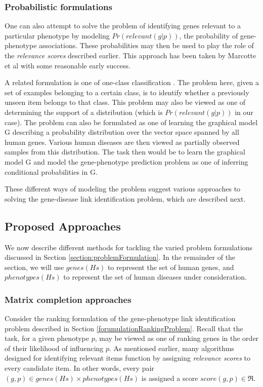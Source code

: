 \subsubsection{Probabilistic formulations}
\label{section:outlier}
One can also attempt to solve the problem of identifying genes relevant to a particular phenotype by modeling $Pr(relevant(g|p))$, the probability of gene-phenotype associations. These probabilities may then be used to play the role of the \textit{relevance scores} described earlier. This approach has been taken by Marcotte et al \cite{McGaryOrthologousPhenotypes} with some reasonable early success.

A related formulation is one of one-class classification \cite{Scholkopf99, ProteinOneClass, OutlierDetection, VillalbaOneClass}. The problem here, given a set of examples belonging to a certain class, is to identify whether a previously unseen item belongs to that class. This problem may also be viewed as one of determining the support of a distribution (which is $Pr(relevant(g|p))$ in our case). The problem can also be formulated as one of learning the graphical model G describing a probability distribution over the vector space spanned by all human genes. Various human diseases are then viewed as partially observed samples from this distribution. The task then would be to learn the graphical model G and model the gene-phenotype prediction problem as one of inferring conditional probabilities in G.

These different ways of modeling the problem suggest various approaches to solving the gene-disease link identification problem, which are described next.

\subsection{Proposed Approaches}
\label{section:proposedApproaches}
We now describe different methods for tackling the varied problem formulations discussed in Section \ref{section:problemFormulation}. In the remainder of the section, we will use $genes(Hs)$ to represent the set of human genes, and $phenotypes(Hs)$ to represent the set of human diseases under consideration.

\subsubsection{Matrix completion approaches}
\label{section:matrixComp}
Consider the ranking formulation of the gene-phenotype link identification problem described in Section \ref{forumulationRankingProblem}. Recall that the task, for a given phenotype $p$, may be viewed as one of ranking genes in the order of their likelihood of influencing $p$. As mentioned earlier, many algorithms designed for identifying relevant items function by assigning \textit{relevance scores} to every candidate item. In other words, every pair $(g, p) \in genes(Hs) \times phenotypes(Hs)$ is assigned a score $score(g,p) \in \Re$.

